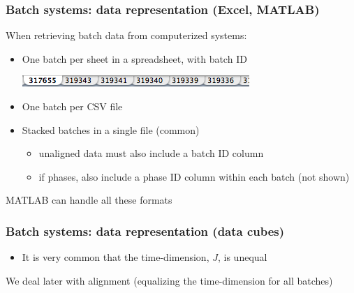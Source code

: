 \documentclass[handout, 12pt]{beamer}
\begin{document}
\begin{frame}\frametitle{Batch systems: data representation (Excel, MATLAB)}

When retrieving batch data from computerized systems:
\begin{itemize}
	\item	One batch per sheet in a spreadsheet, with batch ID
			
			\includegraphics[scale=0.75]{images/batches-in-spreadsheets.png}
	
	\item	One batch per CSV file
	
	\item	Stacked batches in a single file (common)
	
			\begin{itemize}
				\item	unaligned data must also include a batch ID column
				
				\item	if phases, also include a phase ID column within each batch (not shown)
			\end{itemize}
	
\end{itemize}
MATLAB can handle all these formats
\end{frame}

\begin{frame}\frametitle{Batch systems: data representation (data cubes)}
	
	\begin{itemize}
		\item	It is very common that the time-dimension, \( J \), is unequal				
	\end{itemize}
	
	
	We deal later with alignment (equalizing the time-dimension for all batches) 
\end{frame}
\end{document}
